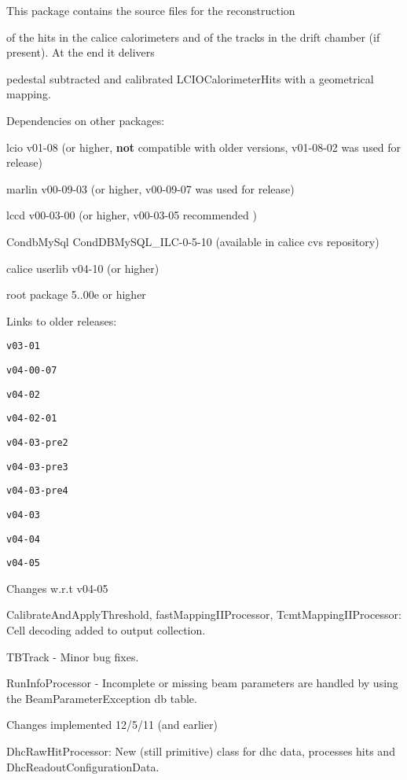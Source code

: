 This package contains the source files for the reconstruction\par
 of the hits in the calice calorimeters and of the tracks in the drift chamber (if present). At the end it delivers\par
 pedestal subtracted and calibrated L\-C\-I\-O\-Calorimeter\-Hits with a geometrical mapping.\par


Dependencies on other packages\-: \par


lcio v01-\/08 (or higher, {\bfseries not} compatible with older versions, v01-\/08-\/02 was used for release)\par
 marlin v00-\/09-\/03 (or higher, v00-\/09-\/07 was used for release)\par
 lccd v00-\/03-\/00 (or higher, v00-\/03-\/05 recommended )\par
 Condb\-My\-Sql Cond\-D\-B\-My\-S\-Q\-L\-\_\-\-I\-L\-C-\/0-\/5-\/10 (available in calice cvs repository)\par
 calice userlib v04-\/10 (or higher) \par
 root package 5..\-00e or higher \par
 Links to older releases\-:\par
 {\tt v03-\/01} \par
 {\tt v04-\/00-\/07} \par
 {\tt v04-\/02} \par
 {\tt v04-\/02-\/01} \par
 {\tt v04-\/03-\/pre2} \par
 {\tt v04-\/03-\/pre3} \par
 {\tt v04-\/03-\/pre4} \par
 {\tt v04-\/03} \par
 {\tt v04-\/04} \par
 {\tt v04-\/05} \par
  Changes w.\-r.\-t v04-\/05 \par

\begin{DoxyItemize}
\item Calibrate\-And\-Apply\-Threshold, fast\-Mapping\-I\-I\-Processor, Tcmt\-Mapping\-I\-I\-Processor\-: Cell decoding added to output collection.\par

\item T\-B\-Track -\/ Minor bug fixes.\par

\item Run\-Info\-Processor -\/ Incomplete or missing beam parameters are handled by using the Beam\-Parameter\-Exception db table.\par
  Changes implemented 12/5/11 (and earlier) 
\item Dhc\-Raw\-Hit\-Processor\-: New (still primitive) class for dhc data, processes hits and Dhc\-Readout\-Configuration\-Data. \par
 
\end{DoxyItemize}